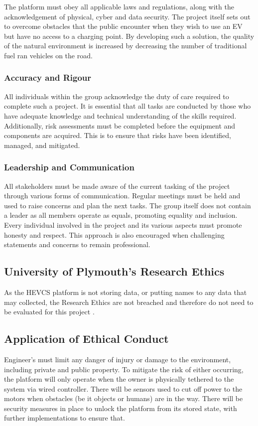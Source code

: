 \documentclass [12pt]{article}
\begin{document}
The platform must obey all applicable laws and regulations, along with the acknowledgement of physical, cyber and data security. The project itself sets out to overcome obstacles that the public encounter when they wish to use an EV but have no access to a charging point. By developing such a solution, the quality of the natural environment is increased by decreasing the number of traditional fuel ran vehicles on the road.

\subsubsection{Accuracy and Rigour}

All individuals within the group acknowledge the duty of care required to complete such a project. It is essential that all tasks are conducted by those who have adequate knowledge and technical understanding of the skills required. Additionally, risk assessments must be completed before the equipment and components are acquired. This is to ensure that risks have been identified, managed, and mitigated.

\subsubsection{Leadership and Communication}

All stakeholders must be made aware of the current tasking of the project through various forms of communication. Regular meetings must be held and used to raise concerns and plan the next tasks. The group itself does not contain a leader as all members operate as equals, promoting equality and inclusion. Every individual involved in the project and its various aspects must promote honesty and respect. This approach is also encouraged when challenging statements and concerns to remain professional.


\subsection{University of Plymouth's Research Ethics}

As the HEVCS platform is not storing data, or putting names to any data that may collected, the Research Ethics are not breached and therefore do not need to be evaluated for this project \cite{Research_Ethics}.

\subsection{Application of Ethical Conduct}
Engineer’s must limit any danger of injury or damage to the environment, including private and public property. To mitigate the risk of either occurring, the platform will only operate when the owner is physically tethered to the system via wired controller. There will be sensors used to cut off power to the motors when obstacles (be it objects or humans) are in the way. There will be security measures in place to unlock the platform from its stored state, with further implementations to ensure that.
\end{document}
